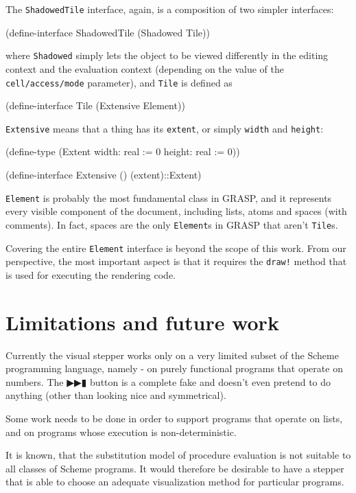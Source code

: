 \documentclass[acmsmall]{acmart}
\newenvironment{Snippet}{\Verbatim[samepage=true]}{\endVerbatim}
\begin{document}
The \texttt{ShadowedTile} interface, again, is a composition
of two simpler interfaces:

\begin{Snippet}
(define-interface ShadowedTile (Shadowed Tile))
\end{Snippet}

where \texttt{Shadowed} simply lets the object to be viewed
differently in the editing context and the evaluation context
(depending on the value of the \texttt{cell\-/access\-/mode}
parameter), and \texttt{Tile} is defined as

\begin{Snippet}
(define-interface Tile (Extensive Element))
\end{Snippet}

\texttt{Extensive} means that a thing has its \texttt{extent},
or simply \texttt{width} and \texttt{height}:

\begin{Snippet}
(define-type (Extent width: real := 0
                     height: real := 0))
  
(define-interface Extensive ()
  (extent)::Extent)
\end{Snippet}

\texttt{Element} is probably the most fundamental class in GRASP, and
it represents every visible component of the document, including
lists, atoms and spaces (with comments). In fact, spaces are the only
\texttt{Element}s in GRASP that aren't \texttt{Tile}s.

Covering the entire \texttt{Element} interface is beyond the scope of
this work. From our perspective, the most important aspect is that it
requires the \texttt{draw!} method that is used for executing the
rendering code.

\section{Limitations and future work}

Currently the visual stepper works only on a very limited subset of
the Scheme programming language, namely - on purely functional
programs that operate on numbers. The ▶▶▮ button is a complete fake
and doesn't even pretend to do anything (other than looking nice and
symmetrical).

Some work needs to be done in order to support programs that operate
on lists, and on programs whose execution is non-deterministic.

It is known, that the substitution model of procedure evaluation is
not suitable to all classes of Scheme programs. It would therefore be
desirable to have a stepper that is able to choose an adequate
visualization method for particular programs.
\end{document}
